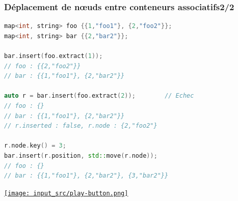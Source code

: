 \documentclass[C++.tex]{subfiles}
\begin{document}
\begin{frame}[fragile]
	\frametitle{Déplacement de nœuds entre conteneurs associatifs\titlehfill{}2/2}
	\begin{lstlisting}[language=C++]
map<int, string> foo {{1,"foo1"}, {2,"foo2"}};
map<int, string> bar {{2,"bar2"}};

bar.insert(foo.extract(1));
// foo : {{2,"foo2"}}
// bar : {{1,"foo1"}, {2,"bar2"}}

auto r = bar.insert(foo.extract(2));		// Echec
// foo : {}
// bar : {{1,"foo1"}, {2,"bar2"}}
// r.inserted : false, r.node : {2,"foo2"}

r.node.key() = 3;
bar.insert(r.position, std::move(r.node));
// foo : {}
// bar : {{1,"foo1"}, {2,"bar2"}, {3,"bar2"}}\end{lstlisting}

	\hfill
	\href{https://godbolt.org/#z:OYLghAFBqd5QCxAYwPYBMCmBRdBLAF1QCcAaPECAMzwBtMA7AQwFtMQByARg9KtQYEAysib0QXACx8BBAKoBnTAAUAHpwAMvAFYTStJg1DIApACYAQuYukl9ZATwDKjdAGFUtAK4sGe1wAyeAyYAHI%2BAEaYxCAAbFykAA6oCoRODB7evnrJqY4CQSHhLFEx8baY9vkMQgRMxASZPn4JdpgO6bX1BIVhkdFxrXUNTdlD3b3FpYMAlLaoXsTI7BzmAMzByN5YANQma25OCgTEmKz72CYaAILrm9uYewcsTIkXV7dmGwxbXrv7bmOxGCwHeNw%2BwQIOxewQgMw%2BJgA7FYbjsdsd0CAQC83gdIaR0QRMSAgSCLjt%2BKg9sikRYEuYzJSuAykQARAm0sykBmUswsxGstn7FHXNEYrE4gH4wnE0lGckRerUqzIrkMxXEPlmPkCoVrEVo/jECBoBjHHZMLxEcyxPYAVgsAGtSAA3Ex21k7EAU1CoeGo5UfNFiolYtBWp5uAE7R2R6NgDgAWgTcYOOxdqbcOxTCeFQepgoD4pQCyhAPjqztbgYuf1%2BaNJoE5st1rMtvdTtd7s93o1/tFgYDIeJ4bLB2jsfLaYTyY4mfT85zqzrAaFRdDJYjU6zuarNeXBplYdLi8r1drIvzGoAdMElA1qL7r5hVCcmA4IFwZvCVwOG6bmytVAbXtTs3Q9L0fT9fNaXzYdjy3cc00nJCdyTFNtwXTClzzVddXXEcT2ws991wv8SEbM0oRbYC21A51wJ7HY%2BxgmkhyPTcxyjZDT1necM2I7MD1YwsB2LUdT3dc9hIIhCuIrKTSN/fMaJ2Ygnk9G872iAhH1QZ9X2Id9dLMb8yMNCiAOooCQI7Bju0gyl%2BzRWD2PEojUJjXiMM8gTPJw38XPwsSNwk4jFIvetLKbazW3bB17Ig3t6mcwcB3gzj5xQ7i0L4zC/JyoShPMgt83cxDCt3aSSvK%2BS02LCJfQMWhEgQJh52IW8zR0zB0FPIrMM6hgMEwa9HUwABPOF%2Bp8wqhpG68cUSXrpvCvdItkzK1uq5SA3mrAxsm1a1k9NYSq07qH063I0gEAlixYVAXUwCB9swMzAp9Y0rItGy6Lsrskqg1LXPSjiws87KKzy3yZpkgc1xCwiKoU9b4Ys76Yt%2BuL6MBpiWLww8MohwqoendC53yuGSsR4mPMqkiNtuYKODmWhODtXg/A4LRSFQTgo0sax0QWJZHnWHhSAITRWbmR0QDtDR9E4SQuZlvnOF4BQQCV6WedZ0g4FgJAX3aICyAoCB6mABRlEMSohAQVAAHducltAWESOgmGqO2QloR2Xe53mPa9%2BgYmALguC5UO6GiAB5K1A9d9XTeQa5iBtzXSDT2p8G53h%2BEEEQxHYKQZEERQVHUfXSF0BIDCMFBrGsfQ8AibXYGYNgQEalICFdAZuERTnvz5xJqm1pMMX2VlTCFywuERLXReWPQMWCP2HadlPuF4E5MBWSXnaMxIZbZjm1dr/mOGwVQzaIdTVAADliRNYkkHZgGQZAdij68zA7AgILKwlgCS4EICQPYXwvz73PnMBAZwsAxDhKQeWitlYcFVqQYOvAb5ax1lLeBmCzBX15vgoh%2Bsx7PWIKkZwkggA}{\texttt{[image: input\_src/play-button.png]}}
\end{frame}
\end{document}
